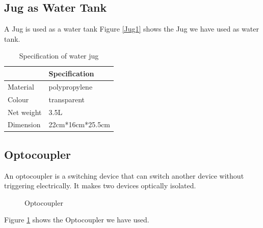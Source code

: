 \subsection{Jug as Water Tank}
A Jug is used as a water tank 
Figure \ref{Jug1} shows the Jug we have used as water tank.

\begin{table}[h]
\centering
\caption{Specification of water jug}
\begin{tabular}{|l|l|}
\hline
\multicolumn{1}{|c|}{\cellcolor[HTML]{FFFFFF}{\color[HTML]{333333} \textbf{Characteristics}}} & \textbf{Specification} \\ \hline
Material                                                                                      & polypropylene          \\ \hline
Colour                                                                                         & transparent            \\ \hline
Net weight                                                                                    & 3.5L                   \\ \hline
Dimension                                                                                     & 22cm*16cm*25.5cm       \\ \hline
\end{tabular}
\end{table}

\subsection{Optocoupler}
An optocoupler is a switching device that can switch another device without triggering electrically. It makes two devices optically isolated.

\begin{figure}[h]
\centering
{} 
\hspace{1in}

\caption{Optocoupler}
\label{Optocupler1}
\end{figure}
Figure \ref{Optocupler1} shows the Optocoupler we have used.

